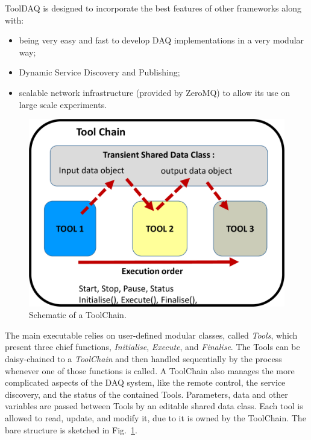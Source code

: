ToolDAQ is designed to incorporate the best features of other frameworks along with:
\begin{itemize}
  \item being very easy and fast to develop DAQ implementations in a very %
    modular way;
  \item Dynamic Service Discovery and Publishing; %
  \item scalable network infrastructure (provided by ZeroMQ) to allow its use on large scale experiments.
\end{itemize}

\begin{figure}
  \centering
  \includegraphics[scale=.13]{pics/pag4richardshkcollaboration}
  \caption{Schematic of a ToolChain.}
  \label{fig:toolchain}
\end{figure}

The main executable relies on user-defined modular classes, called \emph{Tools}, which 
present three chief functions, \emph{Initialise}, \emph{Execute}, and \emph{Finalise}.
The Tools can be daisy-chained to a \emph{ToolChain} and then handled sequentially by the process %
whenever one of those functions is called.
A ToolChain also manages the more complicated aspects of the DAQ system, %
like the remote control, the service discovery, and the status of the contained Tools.
Parameters, data and other variables are passed between Tools by an editable shared data class.
Each tool is allowed to read, update, and modify it, due to it is owned by the ToolChain.
The bare structure is sketched in Fig.~\ref{fig:toolchain}.

